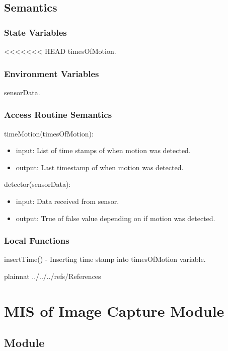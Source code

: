 \documentclass[12pt, titlepage]{article}
\begin{document}
\subsection{Semantics}

\subsubsection{State Variables}
<<<<<<< HEAD
timesOfMotion.

\subsubsection{Environment Variables}
sensorData.

\subsubsection{Access Routine Semantics}

\noindent timeMotion(timesOfMotion):
\begin{itemize}
\item input: List of time stamps of when motion was detected. 
\item output: Last timestamp of when motion was detected. 
\end{itemize}

\noindent detector(sensorData):
\begin{itemize}
\item input: Data received from sensor. 
\item output: True of false value depending on if motion was detected. 
\end{itemize}

\subsubsection{Local Functions}

insertTime() - Inserting time stamp into timesOfMotion variable.

\newpage

 {plainnat}
 {../../../refs/References}


\newpage

\section{MIS of Image Capture Module} \label{Module} 

\subsection{Module}
\end{document}
